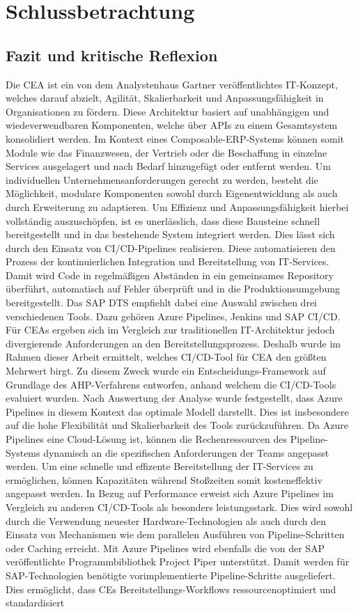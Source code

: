 \section{Schlussbetrachtung}

\subsection{Fazit und kritische Reflexion}
Die CEA ist ein von dem Analystenhaus Gartner veröffentlichtes IT-Konzept, welches darauf abzielt, Agilität, Skalierbarkeit und Anpassungsfähigkeit in Organisationen zu fördern. Diese Architektur basiert auf unabhängigen und wiedeverwendbaren Komponenten, welche über APIs zu einem Gesamtsystem konsolidiert werden. Im Kontext eines Composable-ERP-Systems können somit Module wie das Finanzwesen, der Vertrieb oder die Beschaffung in einzelne Services ausgelagert und nach Bedarf hinzugefügt oder entfernt werden. Um individuellen Unternehmensanforderungen gerecht zu werden, besteht die Möglichkeit, modulare Komponenten sowohl durch Eigenentwicklung als auch durch Erweiterung zu adaptieren. Um Effizienz und Anpassungsfähigkeit hierbei vollständig auszuschöpfen, ist es unerlässlich, dass diese Bausteine schnell bereitgestellt und in das bestehende System integriert werden. Dies lässt sich durch den Einsatz von CI/CD-Pipelines realisieren. Diese automatisieren den Prozess der kontinuierlichen Integration und Bereitstellung von IT-Services. Damit wird Code in regelmäßigen Abständen in ein gemeinsames Repository überführt, automatisch auf Fehler überprüft und in die Produktionsumgebung bereitgestellt. Das SAP DTS empfiehlt dabei eine Auswahl zwischen drei verschiedenen Tools. Dazu gehören Azure Pipelines, Jenkins und SAP CI/CD. Für CEAs ergeben sich im Vergleich zur traditionellen IT-Architektur jedoch divergierende Anforderungen an den Bereitstellungsprozess. Deshalb wurde im Rahmen dieser Arbeit ermittelt, welches CI/CD-Tool für CEA den größten Mehrwert birgt. Zu diesem Zweck wurde ein Entscheidungs-Framework auf Grundlage des AHP-Verfahrens entworfen, anhand welchem die CI/CD-Tools evaluiert wurden. Nach Auswertung der Analyse wurde festgestellt, dass Azure Pipelines in diesem Kontext das optimale Modell darstellt. Dies ist insbesondere auf die hohe Flexibilität und Skalierbarkeit des Tools zurückzuführen. Da Azure Pipelines eine Cloud-Lösung ist, können die Rechenressourcen des Pipeline-Systems dynamisch an die spezifischen Anforderungen der Teams angepasst werden. Um eine schnelle und effizente Bereitstellung der IT-Services zu ermöglichen, können Kapazitäten während Stoßzeiten somit kosteneffektiv angepasst werden. In Bezug auf Performance erweist sich Azure Pipelines im Vergleich zu anderen CI/CD-Tools als besonders leistungsstark. Dies wird sowohl durch die Verwendung neuester Hardware-Technologien als auch durch den Einsatz von Mechanismen wie dem parallelen Ausführen von Pipeline-Schritten oder Caching erreicht. Mit Azure Pipelines wird ebenfalls die von der SAP veröffentlichte Programmbibliothek Project Piper unterstützt. Damit werden für SAP-Technologien benötigte vorimplementierte Pipeline-Schritte ausgeliefert. Dies ermöglicht, dass CEs Bereitstellungs-Workflows ressourcenoptimiert und standardisiert 